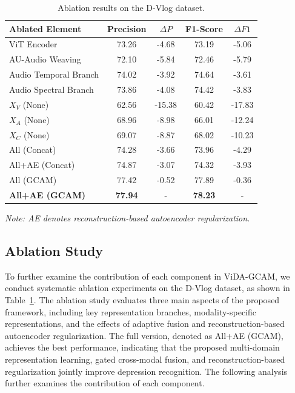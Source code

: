 \documentclass[a4paper,fleqn]{cas-dc}
\begin{document}
\begin{table}[htbp]
\centering
\caption{Ablation results on the D-Vlog dataset.}
\label{tab:Ablation Study}
\footnotesize
\setlength{\tabcolsep}{3.5pt}
\begin{tabular}{lcccc}
\hline
\textbf{Ablated Element} & \textbf{Precision} & \textbf{$\Delta P$} & \textbf{F1-Score} & \textbf{$\Delta F1$}\\
\hline
ViT Encoder             & 73.26             & -4.68     & 73.19             & -5.06\\
AU-Audio Weaving        & 72.10             & -5.84     & 72.46             & -5.79\\
Audio Temporal Branch   & 74.02             & -3.92     & 74.64             & -3.61\\
Audio Spectral Branch   & 73.86             & -4.08     & 74.42             & -3.83\\
\hline
$X_V$ (None)            & 62.56             & -15.38    & 60.42             & -17.83\\
$X_A$ (None)            & 68.96             & -8.98     & 66.01             & -12.24\\
$X_C$ (None)            & 69.07             & -8.87     & 68.02             & -10.23\\
All (Concat)            & 74.28             & -3.66     & 73.96             & -4.29\\
All+AE (Concat)         & 74.87             & -3.07     & 74.32             & -3.93\\
All (GCAM)              & 77.42             & -0.52     & 77.89             & -0.36\\
\textbf{All+AE (GCAM)}  & \textbf{77.94}    & -         & \textbf{78.23}    & -\\
\hline
\end{tabular}

\vspace{0.5em}
\footnotesize
\textit{Note: AE denotes reconstruction-based autoencoder regularization.}
\end{table}


\subsection{Ablation Study}
To further examine the contribution of each component in ViDA-GCAM, we conduct systematic ablation experiments on the D-Vlog dataset, as shown in Table~\ref{tab:Ablation Study}. The ablation study evaluates three main aspects of the proposed framework, including key representation branches, modality-specific representations, and the effects of adaptive fusion and reconstruction-based autoencoder regularization.
 The full version, denoted as All+AE (GCAM), achieves the best performance, indicating that the proposed multi-domain representation learning, gated cross-modal fusion, and reconstruction-based regularization jointly improve depression recognition. The following analysis further examines the contribution of each component.
\end{document}
